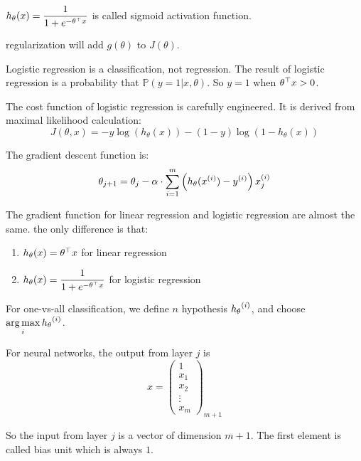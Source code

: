 $\displaystyle h_\theta(x) = \frac{1}{1 + e^{- {\theta}^\top x}}$ is called sigmoid activation function.

regularization will add $g(\theta)$ to $J(\theta)$.

Logistic regression is a classification, not regression. The result of logistic regression is a probability that $\mathbb{P}(y = 1 | x, \theta)$. So $y = 1$ when ${\theta}^\top x > 0$.

The cost function of logistic regression is carefully engineered. It is derived from maximal likelihood calculation:
\begin{equation}
    J(\theta,x) = -y \log \left(h_\theta (x) \right) - (1-y) \log \left(1 - h_\theta (x)\right)
\end{equation}

The gradient descent function is:
\begin{equation}
    \theta_{j+1} = \theta_j - \alpha  \cdot \sum_{i=1}^m \left( h_\theta ({x}^{(i)}) - {y}^{(i)} \right) {x}^{(i)}_{j}
\end{equation}

The gradient function for linear regression and logistic regression are almost the same. the only difference is that:
\begin{enumerate}
    \item $h_\theta(x) = {\theta}^\top x$ for linear regression
    \item $\displaystyle h_\theta (x) = \frac{1}{1 + e^{- {\theta}^\top x}}$ for logistic regression
\end{enumerate}

For one-vs-all classification, we define $n$ hypothesis ${h_\theta}^{(i)}$, and choose $\mathop{\arg\max}\limits_{i} {h_\theta}^{(i)}$.



For neural networks, the output from layer $j$ is 
\begin{equation}
    x = \begin{pmatrix}
        1 \\
        x_1 \\
        x_2 \\
        \vdots \\
        x_m
    \end{pmatrix}_{m+1}
\end{equation}

So the input from layer $j$ is a vector of dimension $m+1$. The first element is called bias unit which is always $1$.

